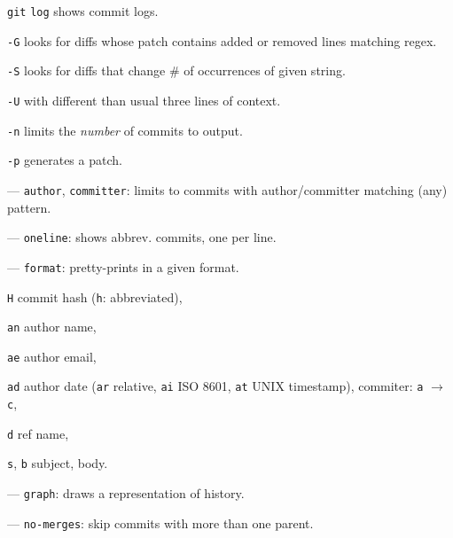 %

\begin{compactenum}
\item [\texttt{git}] \texttt{log} shows commit logs.
\item [\texttt{-G}] looks for diffs whose patch contains added or removed lines matching regex.
\item [\texttt{-S}] looks for diffs that change \# of occurrences of given string.
\item [\texttt{-U}] with different than usual three lines of context.
\item [\texttt{-n}] limits the \emph{number} of commits to output.
\item [\texttt{-p}] generates a patch.
\item [---] \texttt{author}, \texttt{committer}: limits to commits with author/committer matching (any) pattern.
\item [---] \texttt{oneline}: shows abbrev. commits, one per line.
\item [---] \texttt{format}: pretty-prints in a given format.
\begin{compactenum}
\item [\texttt{H}] commit hash (\texttt{h}: abbreviated),
\item [\texttt{an}] author name,
\item [\texttt{ae}] author email,
\item [\texttt{ad}] author date (\texttt{ar} relative, \texttt{ai} ISO 8601, \texttt{at} UNIX timestamp), commiter: \texttt{a} $\to$ \texttt{c},
\item [\texttt{d}] ref name,
\item [\texttt{s}, \texttt{b}] subject, body.
\end{compactenum}
\item [---] \texttt{graph}: draws a representation of history.
\item [---] \texttt{no-merges}: skip commits with more than one parent.
\end{compactenum}

%